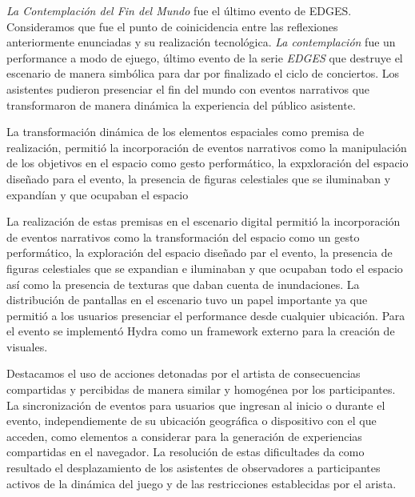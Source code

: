 \textit{La Contemplación del Fin del Mundo} fue el último evento de EDGES. Consideramos que fue el punto de coinicidencia entre las reflexiones anteriormente enunciadas y su realización tecnológica. \textit{La contemplación} fue un performance a modo de ejuego, último evento de la serie \textit{EDGES} que destruye el escenario de manera simbólica para dar por finalizado el ciclo de conciertos. Los asistentes pudieron presenciar el fin del mundo con eventos narrativos que transformaron de manera dinámica la experiencia del público asistente. 

La transformación dinámica de los elementos espaciales como premisa de realización, permitió la incorporación de eventos narrativos como la manipulación de los objetivos en el espacio como gesto performático, la expxloración del espacio diseñado para el evento, la presencia de figuras celestiales que se iluminaban y expandían y que ocupaban el espacio

La realización de estas premisas en el escenario digital permitió la incorporación de eventos narrativos como la transformación del espacio como un gesto performático, la exploración del espacio diseñado par el evento, la presencia de figuras celestiales que se expandian e iluminaban y que ocupaban todo el espacio así como la presencia de texturas que daban cuenta de inundaciones. La distribución de pantallas en el escenario tuvo un papel importante ya que permitió a los usuarios presenciar el performance desde cualquier ubicación. Para el evento se implementó Hydra \citep{hydra} como un framework externo para la creación de visuales.


Destacamos el uso de acciones detonadas por el artista de consecuencias compartidas y percibidas de manera similar y homogénea por los participantes. La sincronización de eventos para usuarios que ingresan al inicio o durante el evento, independiemente de su ubicación geográfica o dispositivo con el que acceden, como elementos a considerar para la generación de experiencias compartidas en el navegador. La resolución de estas dificultades da como resultado el desplazamiento de los asistentes de observadores a participantes activos de la dinámica del juego y de las restricciones establecidas por el arista. 

